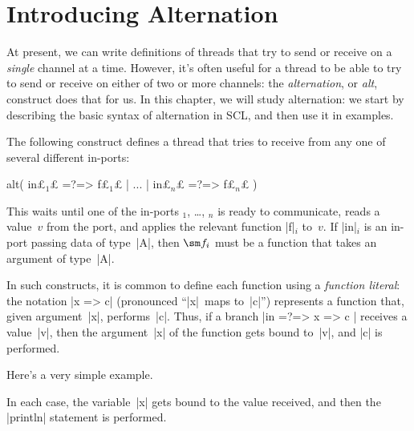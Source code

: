 \section{Introducing Alternation}

At present, we can write definitions of threads that try to send or receive on
a \emph{single} channel at a time.  However, it's often useful for a thread to
be able to try to send or receive on either of two or more channels: the
\emph{alternation}, or \emph{alt}, construct does
that for us. 
%
In this chapter, we will study alternation: we start by describing the basic
syntax of alternation in SCL, and then use it in examples.



The following construct defines a thread that tries to receive from any one of
several different in-ports:
%
\begin{scala}
  alt( in£$_1$£ =?=> {f£$_1$£} | ... | in£$_n$£ =?=> {f£$_n$£} )
\end{scala}
%
This waits until one of the in-ports $_1$, \ldots, $_n$ is
ready to communicate, reads a value~$v$ from the port, and applies the
relevant function |f|$_i$ to~$v$.  If |in|$_i$ is an in-port passing data of
type~|A|, then $\sm f_i$ must be a function that takes an argument of
type~|A|.

In such constructs, it is common to define each function using a
\emph{function literal}: the notation |x => c| (pronounced ``|x|~maps
to~|c|'') represents a function that, given argument~|x|, performs~|c|.  Thus,
if a branch |in =?=> { x => c }| receives a value~|v|, then the argument~|x|
of the function gets bound to~|v|, and |c| is performed.

Here's a very simple example. 
%
%
In each case, the variable~|x| gets bound to the value received, and then the
|println| statement is performed. 

